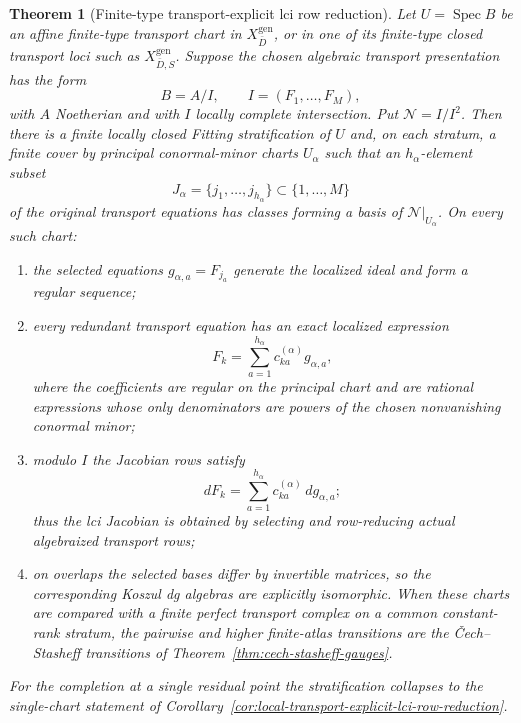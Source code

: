 \documentclass[11pt]{article}
\newtheorem{theorem}{Theorem}[section]
\theoremstyle{definition}
\begin{document}
\begin{theorem}[Finite-type transport-explicit lci row reduction]\label{thm:transport-explicit-lci-row-reduction}
Let $U=\operatorname{Spec}B$ be an affine finite-type transport chart in
$X_{\bar D}^{\mathrm{gen}}$, or in one of its finite-type closed transport
loci such as $X_{\bar D,S}^{\mathrm{gen}}$.  Suppose the chosen algebraic
transport presentation has the form
\[
 B=A/I,\qquad I=(F_1,\ldots,F_M),
\]
with $A$ Noetherian and with $I$ locally complete intersection.  Put
$\mathcal N=I/I^2$.  Then there is a finite locally closed Fitting
stratification of $U$ and, on each stratum, a finite cover by principal
conormal-minor charts $U_\alpha$ such that an $h_\alpha$-element subset
\[
 J_\alpha=\{j_1,\ldots,j_{h_\alpha}\}
\subset\{1,\ldots,M\}
\]
of the original transport equations has classes forming a basis of
$\mathcal N|_{U_\alpha}$.  On every such chart:
\begin{enumerate}[label=\textnormal{(\roman*)}]
\item the selected equations $g_{\alpha,a}=F_{j_a}$ generate the localized
ideal and form a regular sequence;
\item every redundant transport equation has an exact localized expression
\begin{equation}\label{eq:finite-type-redundant-row-expression}
 F_k=\sum_{a=1}^{h_\alpha}c_{ka}^{(\alpha)}g_{\alpha,a},
\end{equation}
where the coefficients are regular on the principal chart and are rational
expressions whose only denominators are powers of the chosen nonvanishing
conormal minor;
\item modulo $I$ the Jacobian rows satisfy
\begin{equation}\label{eq:transport-explicit-lci-row-reduction}
 dF_k=\sum_{a=1}^{h_\alpha}c_{ka}^{(\alpha)}\,dg_{\alpha,a};
\end{equation}
thus the lci Jacobian is obtained by selecting and row-reducing actual
algebraized transport rows;
\item on overlaps the selected bases differ by invertible matrices, so the
corresponding Koszul dg algebras are explicitly isomorphic.  When these
charts are compared with a finite perfect transport complex on a common
constant-rank stratum, the pairwise and higher finite-atlas transitions are
the \v{C}ech--Stasheff transitions of
Theorem~\ref{thm:cech-stasheff-gauges}.
\end{enumerate}
For the completion at a single residual point the stratification collapses
to the single-chart statement of
Corollary~\ref{cor:local-transport-explicit-lci-row-reduction}.
\end{theorem}
\end{document}
